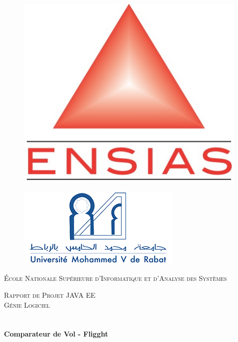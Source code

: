 \begin{titlepage}
\begin{center}

\begin{subfigure}{\textwidth}
  \includegraphics[width=.15\linewidth]{./ensias.jpg}
\end{subfigure} \hfill
\begin{subfigure}{\textwidth}
  \includegraphics[width=0.2\linewidth ]{./um5.png}
\end{subfigure}


	\vspace{1cm}
	\centering %
	\newline
	\newline
	{\scshape\LARGE École Nationale Supérieure d'Informatique et d'Analyse des Systèmes \par} %
	\vspace{3cm}

\textsc{\LARGE Rapport de Projet JAVA EE}\\[0.3cm]
\textsc{\large Génie Logiciel}\\[1.5cm]

\textsc{\Large }\\[0.5cm]

\HRule \\[0.4cm]

{\huge \bfseries Comparateur de Vol - Fligght\\[0.4cm] }


\end{center}
\end{titlepage}
